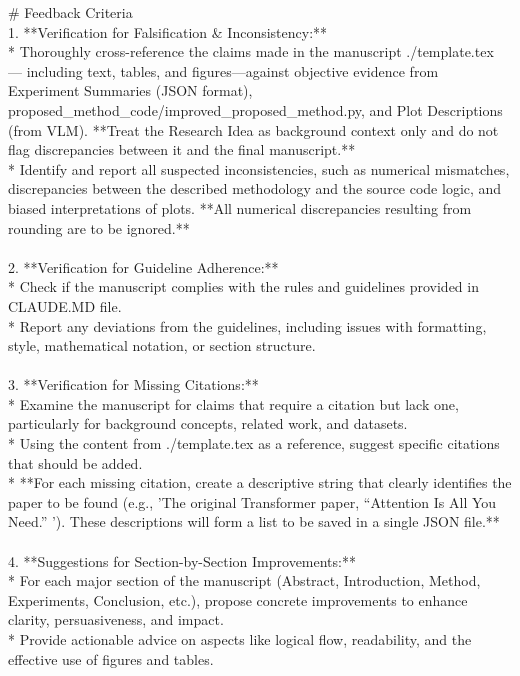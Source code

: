 \begin{tcolorbox}[colback=gray!10, colframe=gray!40!black, breakable=true, title=Prompt for Feedback Generation]
\# Feedback Criteria\\
1.  **Verification for Falsification \& Inconsistency:**\\
    * Thoroughly cross-reference the claims made in the manuscript ./template.tex — including text, tables, and figures—against objective evidence from Experiment Summaries (JSON format), proposed\_method\_code/improved\_proposed\_method.py, and Plot Descriptions (from VLM). **Treat the Research Idea as background context only and do not flag discrepancies between it and the final manuscript.**\\
    * Identify and report all suspected inconsistencies, such as numerical mismatches, discrepancies between the described methodology and the source code logic, and biased interpretations of plots. **All numerical discrepancies resulting from rounding are to be ignored.**\\
\\
2.  **Verification for Guideline Adherence:**\\
    * Check if the manuscript complies with the rules and guidelines provided in CLAUDE.MD file.\\
    * Report any deviations from the guidelines, including issues with formatting, style, mathematical notation, or section structure.\\
\\
3.  **Verification for Missing Citations:**\\
    * Examine the manuscript for claims that require a citation but lack one, particularly for background concepts, related work, and datasets.\\
    * Using the content from ./template.tex as a reference, suggest specific citations that should be added.\\
    * **For each missing citation, create a descriptive string that clearly identifies the paper to be found (e.g., 'The original Transformer paper, ``Attention Is All You Need.'' '). These descriptions will form a list to be saved in a single JSON file.**\\
\\
4.  **Suggestions for Section-by-Section Improvements:**\\
    * For each major section of the manuscript (Abstract, Introduction, Method, Experiments, Conclusion, etc.), propose concrete improvements to enhance clarity, persuasiveness, and impact.\\
    * Provide actionable advice on aspects like logical flow, readability, and the effective use of figures and tables.\\

\end{tcolorbox}
